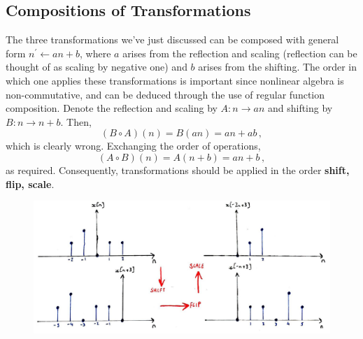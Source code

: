 \subsection{Compositions of Transformations}
%
The three transformations we've just discussed can be composed with general form
$n^\prime \leftarrow an + b$, where $a$ arises from the reflection and scaling (reflection
can be thought of as scaling by negative one) and $b$ arises from the shifting.
The order in which one applies these transformations is important since nonlinear algebra
is non-commutative, and can be deduced through the use of regular function composition.
Denote the reflection and scaling by $A: n\rightarrow an$ and shifting by
$B: n\rightarrow n+b$. Then,
%
\begin{displaymath}
  (B\circ A)(n) = B(an) = an + ab \,,
\end{displaymath}
%
which is clearly wrong. Exchanging the order of operations,
%
\begin{displaymath}
  (A\circ B)(n) = A(n + b) = an + b \,,
\end{displaymath}
%
as required. Consequently, transformations should be applied in the order
\textbf{shift, flip, scale}.
%
\begin{figure}[!htb]
  \includegraphics[width=\textwidth]{images/lecture_1_transformation_order.JPG}
  \caption{
  }
  \label{fig::lecture_1_transformation_order}
\end{figure}


